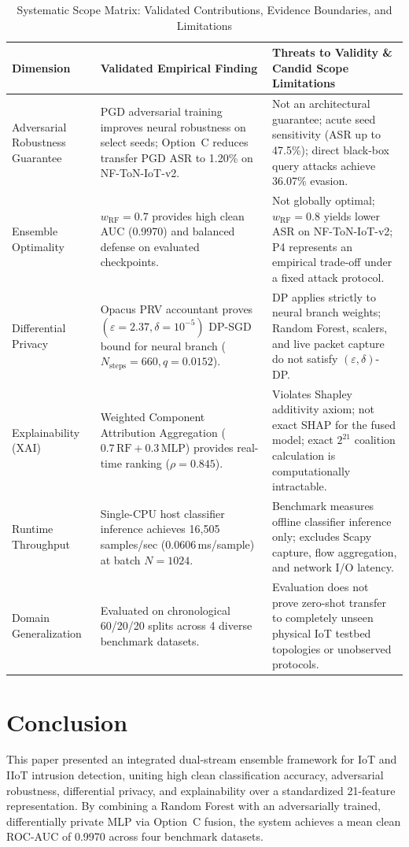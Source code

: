 \documentclass[10pt,journal,compsoc,twocolumn]{IEEEtran}
\begin{document}
\begin{table}[tbp]
\caption{Systematic Scope Matrix: Validated Contributions, Evidence Boundaries, and Limitations}
\label{tab:limitations_matrix}
\centering
\begin{tabular}{p{3.2cm}p{6.8cm}p{6.5cm}}
\toprule
\textbf{Dimension} & \textbf{Validated Empirical Finding} & \textbf{Threats to Validity \& Candid Scope Limitations} \\
\midrule
Adversarial Robustness Guarantee & PGD adversarial training improves neural robustness on select seeds; Option~C reduces transfer PGD ASR to 1.20\% on NF-ToN-IoT-v2. & Not an architectural guarantee; acute seed sensitivity (ASR up to 47.5\%); direct black-box query attacks achieve 36.07\% evasion. \\
\midrule
Ensemble Optimality & $w_{\text{RF}}=0.7$ provides high clean AUC (0.9970) and balanced defense on evaluated checkpoints. & Not globally optimal; $w_{\text{RF}}=0.8$ yields lower ASR on NF-ToN-IoT-v2; P4 represents an empirical trade-off under a fixed attack protocol. \\
\midrule
Differential Privacy & Opacus PRV accountant proves $(\varepsilon=2.37, \delta=10^{-5})$ DP-SGD bound for neural branch ($N_{\text{steps}}=660, q=0.0152$). & DP applies strictly to neural branch weights; Random Forest, scalers, and live packet capture do not satisfy $(\varepsilon, \delta)$-DP. \\
\midrule
Explainability (XAI) & Weighted Component Attribution Aggregation ($0.7\,\text{RF} + 0.3\,\text{MLP}$) provides real-time ranking ($\rho = 0.845$). & Violates Shapley additivity axiom; not exact SHAP for the fused model; exact $2^{21}$ coalition calculation is computationally intractable. \\
\midrule
Runtime Throughput & Single-CPU host classifier inference achieves 16,505 samples/sec (0.0606\,ms/sample) at batch $N=1024$. & Benchmark measures offline classifier inference only; excludes Scapy capture, flow aggregation, and network I/O latency. \\
\midrule
Domain Generalization & Evaluated on chronological 60/20/20 splits across 4 diverse benchmark datasets. & Evaluation does not prove zero-shot transfer to completely unseen physical IoT testbed topologies or unobserved protocols. \\
\bottomrule
\end{tabular}
\end{table}

\section{Conclusion}
This paper presented an integrated dual-stream ensemble framework for IoT and IIoT intrusion detection, uniting high clean classification accuracy, adversarial robustness, differential privacy, and explainability over a standardized 21-feature representation. By combining a Random Forest with an adversarially trained, differentially private MLP via Option~C fusion, the system achieves a mean clean ROC-AUC of 0.9970 across four benchmark datasets.
\end{document}
